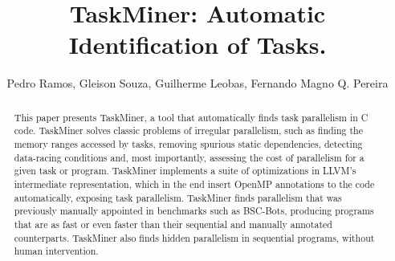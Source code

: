 \documentclass[sigconf]{acmart}
\newcommand\Taskminer{\mbox{\textsf{TaskMiner}}}
\begin{document}
\title[TaskMiner: Automatic Identification of Tasks.]
{TaskMiner: Automatic Identification of Tasks.}



\author{Pedro Ramos, Gleison Souza, Guilherme Leobas, Fernando Magno Q. Pereira}




\begin{abstract}
This paper presents \Taskminer{}, a tool that automatically finds task parallelism in C code. \Taskminer{} solves classic problems of irregular parallelism, such as finding the memory ranges accessed by tasks, removing spurious static dependencies, detecting data-racing conditions and, most importantly, assessing the cost of parallelism for a given task or program. \Taskminer{} implements a suite of optimizations in LLVM's intermediate representation, which in the end insert \textsf{OpenMP} annotations to the code automatically, exposing task parallelism. \Taskminer{} finds parallelism that was previously manually appointed in benchmarks such as \textsf{BSC-Bots}, producing programs that are as fast or even faster than their sequential and manually annotated counterparts. \Taskminer{} also finds hidden parallelism in sequential programs, without human intervention.
\end{abstract}
\end{document}
